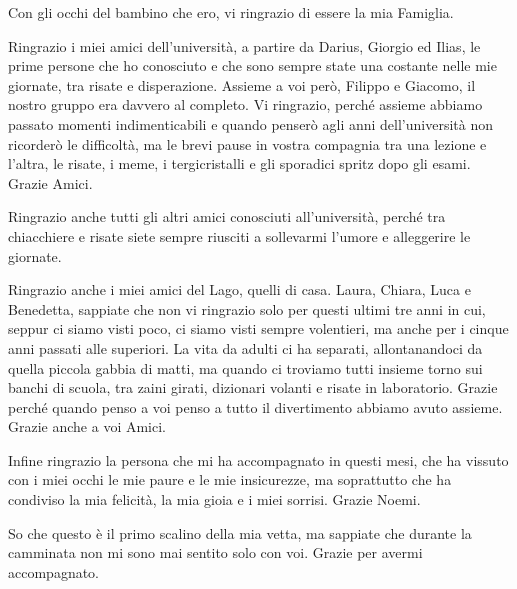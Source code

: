 \begin{dedication}
  Con gli occhi del bambino che ero, vi ringrazio di essere la mia Famiglia.

  \vspace{1cm}


  Ringrazio i miei amici dell'università, a partire da Darius, Giorgio ed Ilias, le prime persone che ho conosciuto e che sono sempre state una costante nelle mie giornate, tra risate e disperazione. Assieme a voi però, Filippo e Giacomo, il nostro gruppo era davvero al completo. Vi ringrazio, perché assieme abbiamo passato momenti indimenticabili e quando penserò agli anni dell'università non ricorderò le difficoltà, ma le brevi pause in vostra compagnia tra una lezione e l'altra, le risate, i meme, i tergicristalli e gli sporadici spritz dopo gli esami. Grazie Amici.

  Ringrazio anche tutti gli altri amici conosciuti all'università, perché tra chiacchiere e risate siete sempre riusciti a sollevarmi l'umore e alleggerire le giornate.

  Ringrazio anche i miei amici del Lago, quelli di casa. Laura, Chiara, Luca e Benedetta, sappiate che non vi ringrazio solo per questi ultimi tre anni in cui, seppur ci siamo visti poco, ci siamo visti sempre volentieri, ma anche per i cinque anni passati alle superiori. La vita da adulti ci ha separati, allontanandoci da quella piccola gabbia di matti, ma quando ci troviamo tutti insieme torno sui banchi di scuola, tra zaini girati, dizionari volanti e risate in laboratorio. Grazie perché quando penso a voi penso a tutto il divertimento abbiamo avuto assieme. Grazie anche a voi Amici.
  
  
  Infine ringrazio la persona che mi ha accompagnato in questi mesi, che ha vissuto con i miei occhi le mie paure e le mie insicurezze, ma soprattutto che ha condiviso la mia felicità, la mia gioia e i miei sorrisi. Grazie Noemi.

  
  \vspace{1cm}
  
  So che questo è il primo scalino della mia vetta, ma sappiate che durante la camminata non mi sono mai sentito solo con voi. Grazie per avermi accompagnato. 
\end{dedication}
